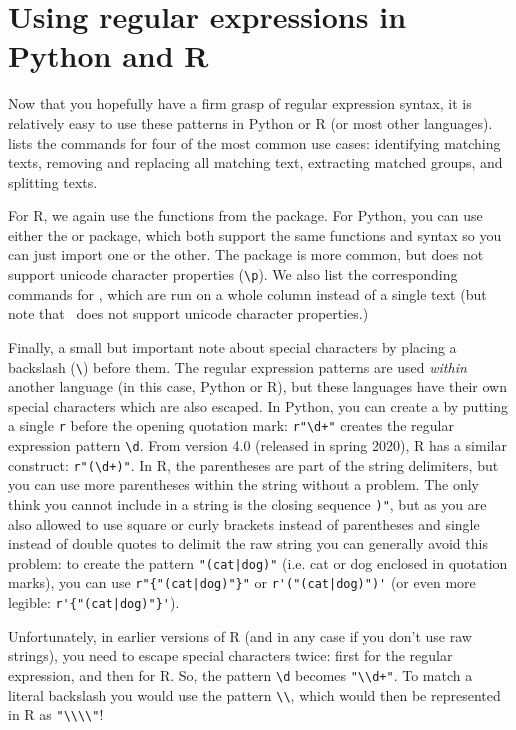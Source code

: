 \section{Using regular expressions in Python and R}\label{sec:regextract}

Now that you hopefully have a firm grasp of regular expression syntax,
it is relatively easy to use these patterns in Python or R (or most other languages).
 lists the commands for four of the most common use cases:
identifying matching texts, removing and replacing all matching text, extracting matched groups, and splitting texts.



For R, we again use the functions from the  package.
For Python, you can use either the  or  package,
which both support the same functions and syntax so you can just import one or the other.
The  package is more common, but does not support unicode character properties (\verb!\p!).
We also list the corresponding commands for \pandas, which are run on a whole column instead of a single text 
(but note that \pandas\ does not support unicode character properties.)

Finally, a small but important note about  special characters by placing a backslash (\verb|\|) before them.
The regular expression patterns are used \emph{within} another language (in this case, Python or R), but these languages have their own
special characters which are also escaped. In Python, you can create a  by putting a single \verb|r| before the opening quotation mark:
\verb|r"\d+"| creates the regular expression pattern \verb|\d|.
From version 4.0 (released in spring 2020), R has a similar construct: \verb|r"(\d+)"|. In R, the parentheses are part of the string delimiters, but you can use more parentheses within the string without a problem.
The only think you cannot include in a string is the closing sequence \verb|)"|, but as you are also allowed to use square or curly brackets instead of parentheses and single instead of double quotes to delimit the raw string you can generally avoid this problem:
to create the pattern \verb!"(cat|dog)"! (i.e. cat or dog enclosed in quotation marks), you can use \verb!r"{"(cat|dog)"}"! or \verb!r'("(cat|dog)")'! (or even more legible: \verb!r'{"(cat|dog)"}'!). 

Unfortunately, in earlier versions of R (and in any case if you don't use raw strings), you need to escape special characters twice:
first for the regular expression, and then for R. So, the pattern \verb|\d| becomes \verb|"\\d+"|. To match a literal backslash you would use the pattern \verb|\\|,
which would then be represented in R as \verb|"\\\\"|!


